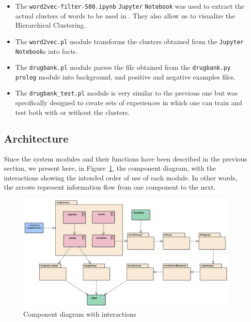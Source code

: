 \documentclass[12pt, openany]{book}
\begin{document}
\begin{itemize}
	\item The \texttt{word2vec-filter-500.ipynb} \texttt{Jupyter} \texttt{Notebook} was used to extract the actual clusters of words to be used in \alephilp. They also allow us to visualize the Hierarchical Clustering.
	\item The \texttt{word2vec.pl} module transforms the clusters obtained from the \texttt{Jupyter} \texttt{Notebook}s into \prolog facts.
	\item The \texttt{drugbank.pl} module parses the \xml file obtained from the \texttt{drugbank.py prolog} module into \alephilp background, and positive and negative examples files.
	\item The \texttt{drugbank\_test.pl} module is very similar to the previous one but was specifically designed to create sets of experiences in which one can train and test both with or without the \wordvec clusters.
\end{itemize}

\subsection{Architecture}
	
Since the system modules and their functions have been described in the previous section, we present here, in Figure~\ref{diagram}, the component diagram, with the interactions showing the intended order of use of each module. In other words, the arrows represent information flow from one component to the next.

\begin{figure}[ht]
\begin{center}
\includegraphics[width=16cm]{diagram.jpg}
\caption{Component diagram with interactions}
\label{diagram}
\end{center}
\end{figure}
\end{document}
